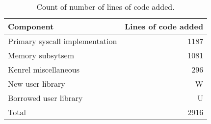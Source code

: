
\begin{table}[t]
\begin{tabularx}{233pt}{l | r}
Component & Lines of code added \\
\hline
Primary syscall implementation & 1187 \\
Memory subsytsem & 1081 \\
Kenrel miscellaneous & 296 \\
New user library & W \\
Borrowed user library & U \\
\hline
Total & 2916
\end{tabularx}
\caption{Count of number of lines of code added.}
\label{tab:loc}
\end{table}

\endinput

